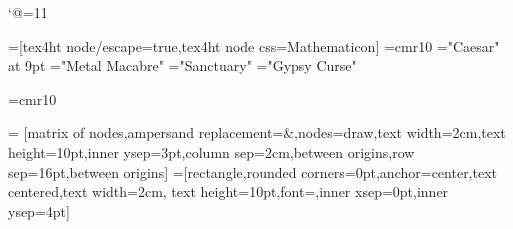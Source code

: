 \catcode`@=11\relax




\def\Inferno{}

\def\LD@Exercice@Display@Code{\eightpts}%
\LD@Exo@Label@Hide
\LD@Colors@Hide
\overfullrule=0pt%

	
\ifHtml
	
	=[tex4ht node/escape=true,tex4ht node css=Mathematicon]%
	\font\LD@Font@ResMathematica=cmr10%
\else
	\LD@AFour@Book
	\font\LD@Font@ResMathematica="Caesar" at 9pt
	\font\LD@Font@Gothic="Metal Macabre"\relax
	\font\LD@Font@Sanctuary="Sanctuary"\relax
	\font\LD@Font@Inferno="Gypsy Curse"\relax
\fi


\def\pgfutil@EveryShipout@Output{%
  \setbox255=\vbox{%
    \setbox0=\hbox{\pgfutil@abe\pgfutil@abc\global\let\pgfutil@abc\pgfutil@empty}%
    \wd0=0pt%
    \ht0=0pt%
    \dp0=0pt%
    \box0%
    \makeheadline
    \unvbox255%
    \makefootline
  }%
  \pgfutil@@EveryShipout@Org@Shipout\box\@cclv%
}


\def\LD@Public@Star{PT*}%

\def\Red#1{#1}%
\def\Blue#1{#1}%
\def\pspicture#1\endpspicture{}%
\long\def\IGNORE#1\IGNORE{}%

\font\SvgText=cmr10\relax


\tenrm

\def\TipSection{}%
\def\Tip#1{\ifHtml\Par\fi\EA\sidx\EA{\TipSection!#1}}%

\def\LD@Index@List{%
	Théorèmes,Théorème,Formules,Formule,Propriétés,Propriété,%
	Inégalités,Inégalité,Identités,Identité,Inégalités,Inégalité,%
	Distance,Intersection,Raisonnement,Récurrence,Relations,Relation,Point,%
	Lien,Espaces vectoriels,Espace vectoriel,Suites,Interprétation,%
	Fonctions,Produit,Loi,Déterminant,Principe,%
	Opérateur logique,Equation,Aire,Volume,Changement%
}%

= [matrix of nodes,ampersand replacement=\&,nodes={draw,text width=2cm,text height=10pt,inner ysep=3pt},column sep={2cm,between origins},row sep={16pt,between origins}]
=[rectangle,rounded corners=0pt,anchor=center,text centered,text width=2cm, text height=10pt,font=\SvgText,inner xsep=0pt,inner ysep=4pt]




\def\imageFolder{/media/Main/TeX/Images}


